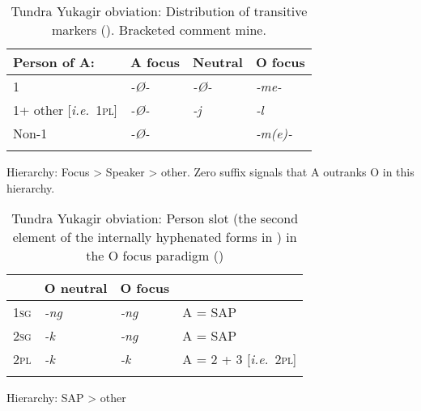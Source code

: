 \documentclass[output=collectionpaper]{langsci/langscibook}
\begin{document}
\begin{table}
\caption{Tundra Yukagir obviation: Distribution of transitive markers (\citealt[17]{Maslov2003}). Bracketed comment mine.}
\label{extab:Nich:18}

\begin{tabularx}{\textwidth}{XXXl}
\lsptoprule
	Person of A: &		A focus &	Neutral &		O focus	 \\
			 \midrule
	1	 & 	\itshape 	-Ø-	  &	 \itshape  -Ø-	  & \itshape 	-me- \\
	1+ other [\textit{i.e.}\ \textsc{1pl}] &	\itshape -Ø-	 &\itshape 	  -j	 &  \itshape 	-l \\
	Non-1 &		\itshape 	-Ø-	 & &		 \itshape 	 -m(e)- \\
\lspbottomrule
\end{tabularx}
\parbox{\textwidth}{\footnotesize	 Hierarchy:  Focus > Speaker > other. Zero suffix signals that A outranks O in this hierarchy. }
\end{table}


\begin{table}
\caption{Tundra Yukagir obviation: Person slot (the second element of the internally hyphenated forms in ) in the O focus paradigm (\citealt[20]{Maslov2003})}
\label{extab:Nich:19}

\begin{tabularx}{\textwidth}{lXXl}
\lsptoprule
		 & O neutral &	O focus & \\
			 \midrule
	\textsc{1sg} & 	\itshape  -ng &	    \itshape   	 -ng &				A = SAP\\ \cline{2-2}
	\textsc{2sg}  &	\itshape  -k  &	\multicolumn{1}{|l}{\itshape -ng}	 &			A = SAP	\\ \cline{3-3}
	\textsc{2pl} &	\itshape  -k &	 \itshape 	 -k	 &			A = 2 + 3	[\textit{i.e.}\ \textsc{2pl}] \\ 
	\lspbottomrule
\end{tabularx}
\parbox{\textwidth}{\footnotesize Hierarchy: SAP > other}
\end{table}
\end{document}
